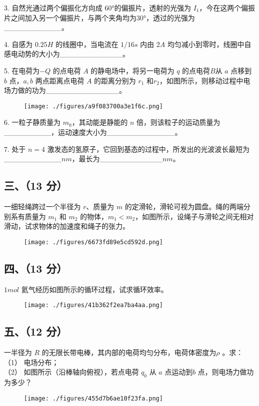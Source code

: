 3. 自然光通过两个偏振化方向成 60°的偏振片，透射的光强为 $I_1$，今在这两个偏振片之间加入另一个偏振片，与两个夹角均为30°，透过的光强为___________。

4. 自感为 $0.25H$ 的线圈中，当电流在 $1/16s$ 内由 $2A$ 均匀减小到零时，线圈中自感电动势的大小为____________。

5. 在电荷为$-Q$ 的点电荷 $A$ 的静电场中，将另一电荷为 $q$ 的点电荷$B$从 $a$ 点移到 $b$ 点，$a,b$ 两点距离点电荷 $A$ 的距离分别为 $r_1$ 和$r_2$，如图所示，则移动过程中电场力做的功为______________。
\begin{figure}[ht]
\centering
\texttt{[image: ./figures/a9f083700a3e1f6c.png]}
\caption{} \label{fig_NJUD3_2}
\end{figure}
6. 一粒子静质量为 $m_0$，其动能是静能的 $n$ 倍，则该粒子的运动质量为_________，运动速度大小为_____________。

7. 处于 $n=4$ 激发态的氢原子，它回到基态的过程中，所发出的光波波长最短为___________$nm$，最长为____________$nm$。
\subsection{三、（13 分）}
一细轻绳跨过一个半径为 $r$、质量为 $m$ 的定滑轮，滑轮可视为圆盘。绳的两端分别系有质量为 $m_1$ 和 $m_2$ 的物体，$m_1<m_2$，如图所示，设绳子与滑轮之间无相对滑动，试求物体的加速度和绳子的张力。
\begin{figure}[ht]
\centering
\texttt{[image: ./figures/6673fd89e5cd592d.png]}
\caption{} \label{fig_NJUD3_3}
\end{figure}
\subsection{四、（13 分）}
$1mol$ 氦气经历如图所示的循环过程，试求循环效率。
\begin{figure}[ht]
\centering
\texttt{[image: ./figures/41b362f2ea7ba4aa.png]}
\caption{} \label{fig_NJUD3_4}
\end{figure}
\subsection{五、（12 分）}
一半径为 $R$ 的无限长带电棒，其内部的电荷均匀分布，电荷体密度为$\rho$ 。求：
（1） 电场分布；\\
（2） 如图所示（沿棒轴向俯视），若点电荷 $q_0$ 从 $a$ 点运动到$b$ 点，则电场力做功为多少？
\begin{figure}[ht]
\centering
\texttt{[image: ./figures/455d7b6ae10f23fa.png]}
\caption{} \label{fig_NJUD3_5}
\end{figure}
